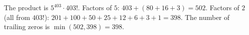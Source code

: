 The product is $5^{403}\cdot403!$. Factors of $5$: $403+\left(80+16+3\right)=502$. Factors of $2$ (all from $403!$): $201+100+50+25+12+6+3+1=398$. The number of trailing zeros is $\min(502,398)=\boxed{398}$.
